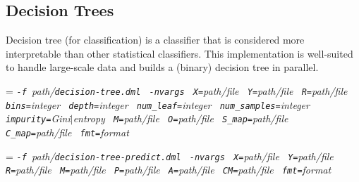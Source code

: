 \subsection{Decision Trees}
\label{sec:decision_trees}

\smallskip


Decision tree (for classification) is a classifier that is considered
more interpretable than other statistical classifiers. This implementation
is well-suited to handle large-scale data and builds a (binary) decision 
tree in parallel.\\

\smallskip
{}
\smallskip

{\hangindent=\parindent\noindent\it%
	{\tt{}-f }path/\/{\tt{}decision-tree.dml}
	{\tt{} -nvargs}
	{\tt{} X=}path/file
	{\tt{} Y=}path/file
	{\tt{} R=}path/file
	{\tt{} bins=}integer
	{\tt{} depth=}integer
	{\tt{} num\_leaf=}integer
	{\tt{} num\_samples=}integer
	{\tt{} impurity=}Gini$\mid$entropy
	{\tt{} M=}path/file
	{\tt{} O=}path/file
	{\tt{} S\_map=}path/file
	{\tt{} C\_map=}path/file
	{\tt{} fmt=}format
	
}

 \smallskip
 \smallskip
 
 {\hangindent=\parindent\noindent\it%
 	{\tt{}-f }path/\/{\tt{}decision-tree-predict.dml}
 	{\tt{} -nvargs}
 	{\tt{} X=}path/file
 	{\tt{} Y=}path/file
 	{\tt{} R=}path/file
 	{\tt{} M=}path/file
 	{\tt{} P=}path/file
 	{\tt{} A=}path/file
 	{\tt{} CM=}path/file
 	{\tt{} fmt=}format
 	
 }\smallskip
 
